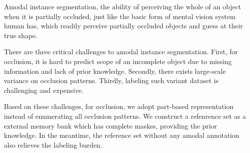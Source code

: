 \documentclass[10pt,twocolumn,letterpaper]{article}
\begin{document}
Amodal instance segmentation, the ability of perceiving the whole of an object when it is partially occluded,
just like the basic form of mental vision system human has, which readily perceive partially occluded
objects and guess at their true shape.

There are three critical challenges to amodal instance segmentation. First, for occlusion, it is hard to 
predict scope of an incomplete object due to missing information and lack of prior knowledge. Secondly, there
exists large-scale variance on occlusion patterns. Thirdly, labeling such variant dataset is challenging
and expensive.

Based on these challenges, for occlusion, we adopt part-based representation instead of 
enumerating all occlusion patterns. We construct a refenrence set as a external memory bank which has complete maskes, providing the prior knowledge. In the meantime, the reference set without any amodal 
annotation also relieves the labeling burden.
\end{document}
